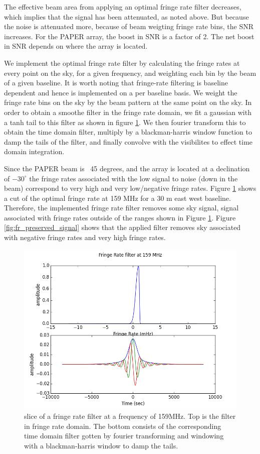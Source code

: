 \documentclass[twocolumn,numberedappendix]{emulateapj} \shorttitle{PSA64}
\begin{document}
The effective beam area from applying an optimal fringe rate filter decreases,
which implies that the signal has been attenuated, as noted above. But because
the noise is attenuated more, because of beam weigting fringe rate bins, the SNR
increases. For the PAPER array, the boost in SNR is a factor of 2. The net boost
in SNR depends on where the array is located. 

We implement the optimal fringe rate filter by calculating the fringe rates at
every point on the sky, for a given frequency, and weighting each bin by the
beam of a given baseline. It is worth noting that fringe-rate filtering is
baseline dependent and hence is implemented on a per baseline basis. We weight
the fringe rate bins on the sky by the beam pattern at the same point on the
sky. In order to obtain a smoothe filter in the fringe rate domain, we fit a
gaussian with a tanh tail to this filter as shown in figure
\ref{fig:fringe_rate_cut}. We then fourier transform this to obtain the time
domain filter, multiply by a blackman-harris window function to damp the tails
of the filter, and finally convolve with the visibilites to effect time domain
integration.

Since the PAPER beam is ~45 degrees, and the array is located at a declination
of $-30^{\circ}$ the fringe rates associated with the low signal to noise (down
in the beam) correspond to very high and very low/negative fringe rates. Figure
\ref{fig:fringe_rate_cut} shows a cut of the optimal fringe rate at 159 MHz for
a 30 m east west baseline. Therefore, the implemented fringe rate filter removes
some sky signal, signal associated with fringe rates outside of the ranges shown
in Figure \ref{fig:fringe_rate_cut}. Figure \ref{fig:fr_preserved_signal} shows
that the applied filter removes sky associated with negative fringe rates and
very high fringe rates. 

\begin{figure}
\centering
\includegraphics[width=\columnwidth]{plots/fr_filter_slice.png}
\caption{slice of a fringe rate filter at a frequency of 159MHz. Top is the
filter in fringe rate domain. The bottom consists of the corresponding time
domain filter gotten by fourier transforming and windowing with a
blackman-harris window to damp the tails.}
\label{fig:fringe_rate_cut}
\end{figure}
\end{document}
